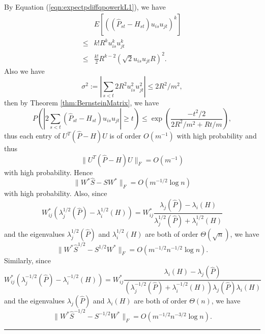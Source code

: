\documentclass[a4paper]{article}
\newenvironment{proof}{{\bf Proof:  }}{\hfill\rule{2mm}{2mm}}
\begin{document}
\begin{proof}
By Equation (\ref{eqn:expectpdiffqpowerkL1}), we have
\begin{align*}
	& E\left[\left((\hat{P}_{st} - H_{st}) u_{is} u_{jt}\right)^k\right] \\ 
    \le & k! R^k u_{is}^k u_{jt}^k \\
    \le & \frac{k!}{2} R^{k-2} (\sqrt{2} u_{is} u_{jt} R)^2.
\end{align*}
Also we have
\[
	\sigma^2 := |\sum_{s<t} 2 R^2 u_{is}^2 u_{jt}^2|
    \le 2 R^2 / m^2,
\]
then by Theorem \ref{thm:BernsteinMatrix}, we have
\[
	P \left( \left| 2 \sum_{s<t} (\hat{P}_{st} - H_{st}) u_{is} u_{jt} \right| \ge t \right)
    \le \exp \left( \frac{-t^2/2}{2 R^2 / m^2 + R t / m} \right),
\]
thus each entry of $U^T(\hat{P} - H)U$ is of order $O(m^{-1})$ with high probability and thus 
\begin{equation}
\label{eqn:uPhatdiffHuL1}
	\|U^T(\hat{P} - H)U\|_F = O(m^{-1})
\end{equation}
with high probability.
Hence
\[
	\| W^* \hat{S} - S W^* \|_F = O(m^{-1/2} \log n)
\]
with high probability.
Also, since
\[
	W_{ij}^* (\lambda_j^{1/2}(\hat{P}) - \lambda_i^{1/2}(H)) = W_{ij}^* \frac{\lambda_j(\hat{P}) - \lambda_i(H)}{\lambda_j^{1/2}(\hat{P}) + \lambda_i^{1/2}(H)}
\]
and the eigenvalues $\lambda_j^{1/2}(\hat{P})$ and $\lambda_i^{1/2}(H)$ are both of order $\Theta(\sqrt{n})$, we have
\[
	\| W^* \hat{S}^{1/2} - S^{1/2} W^* \|_F = O(m^{-1/2} n^{-1/2} \log n).
\]
Similarly, since
\[
	W_{ij}^* (\lambda_j^{-1/2}(\hat{P}) - \lambda_i^{-1/2}(H)) = W_{ij}^* \frac{\lambda_i(H) - \lambda_j(\hat{P})}{(\lambda_j^{-1/2}(\hat{P}) + \lambda_i^{-1/2}(H))\lambda_j(\hat{P}) \lambda_i(H)}
\]
and the eigenvalues $\lambda_j(\hat{P})$ and $\lambda_i(H)$ are both of order $\Theta(n)$, we have
\[
	\| W^* \hat{S}^{-1/2} - S^{-1/2} W^* \|_F = O(m^{-1/2} n^{-3/2} \log n).
\]
\end{proof}
\end{document}
